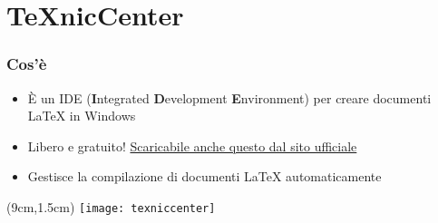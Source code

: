 \section{TeXnicCenter}
  \begin{frame}
    \frametitle{Cos'è}
    
    \begin{itemize}
      \item È un IDE (\textbf{I}ntegrated \textbf{D}evelopment 
\textbf{E}nvironment) per creare documenti \LaTeX{} in Windows
      \item Libero e gratuito! 
\href{http://www.texniccenter.org/download/}{Scaricabile anche questo dal sito 
ufficiale}
      \item Gestisce la compilazione di documenti \LaTeX{} automaticamente
    \end{itemize}
    
    \begin{textblock*}{5cm}(9cm,1.5cm)
      \texttt{[image: texniccenter]}
    \end{textblock*}

  \end{frame}